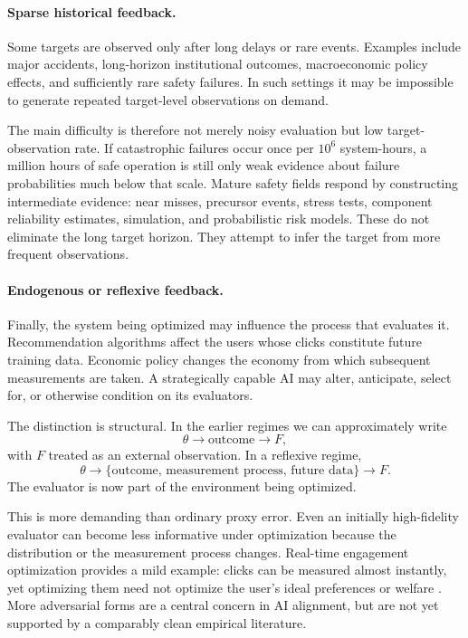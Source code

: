 \paragraph{Sparse historical feedback.}
Some targets are observed only after long delays or rare events.  Examples include
major accidents, long-horizon institutional outcomes, macroeconomic policy effects,
and sufficiently rare safety failures.  In such settings it may be impossible to
generate repeated target-level observations on demand.

The main difficulty is therefore not merely noisy evaluation but low target-observation
rate.  If catastrophic failures occur once per \(10^6\) system-hours, a million
hours of safe operation is still only weak evidence about failure probabilities much
below that scale.  Mature safety fields respond by constructing intermediate evidence:
near misses, precursor events, stress tests, component reliability estimates,
simulation, and probabilistic risk models.  These do not eliminate the long target
horizon.  They attempt to infer the target from more frequent observations.

\paragraph{Endogenous or reflexive feedback.}
Finally, the system being optimized may influence the process that evaluates it.
Recommendation algorithms affect the users whose clicks constitute future training
data.  Economic policy changes the economy from which subsequent measurements are
taken.  A strategically capable AI may alter, anticipate, select for, or otherwise
condition on its evaluators.

The distinction is structural.  In the earlier regimes we can approximately write
\[
    \theta \longrightarrow \text{outcome}
    \longrightarrow F,
\]
with \(F\) treated as an external observation.  In a reflexive regime,
\[
    \theta
    \longrightarrow
    \{\text{outcome},\,\text{measurement process},\,\text{future data}\}
    \longrightarrow F.
\]
The evaluator is now part of the environment being optimized.

This is more demanding than ordinary proxy error.  Even an initially high-fidelity
evaluator can become less informative under optimization because the distribution or
the measurement process changes.  Real-time engagement optimization provides a mild
example: clicks can be measured almost instantly, yet optimizing them need not optimize
the user's ideal preferences or welfare \parencite{khambatta2023ideal}.  More adversarial
forms are a central concern in AI alignment, but are not yet supported by a comparably
clean empirical literature.

